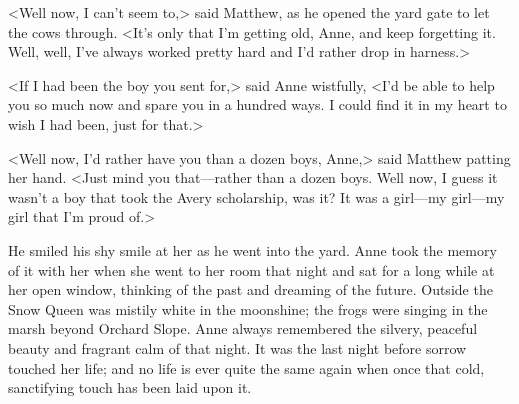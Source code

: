 <Well now, I can't seem to,> said Matthew, as he opened the yard gate to let the cows through. <It's only that I'm getting old, Anne, and keep forgetting it. Well, well, I've always worked pretty hard and I'd rather drop in harness.>

<If I had been the boy you sent for,> said Anne wistfully, <I'd be able to help you so much now and spare you in a hundred ways. I could find it in my heart to wish I had been, just for that.>

<Well now, I'd rather have you than a dozen boys, Anne,> said Matthew patting her hand. <Just mind you that—rather than a dozen boys. Well now, I guess it wasn't a boy that took the Avery scholarship, was it? It was a girl—my girl—my girl that I'm proud of.>

He smiled his shy smile at her as he went into the yard. Anne took the memory of it with her when she went to her room that night and sat for a long while at her open window, thinking of the past and dreaming of the future. Outside the Snow Queen was mistily white in the moonshine; the frogs were singing in the marsh beyond Orchard Slope. Anne always remembered the silvery, peaceful beauty and fragrant calm of that night. It was the last night before sorrow touched her life; and no life is ever quite the same again when once that cold, sanctifying touch has been laid upon it.